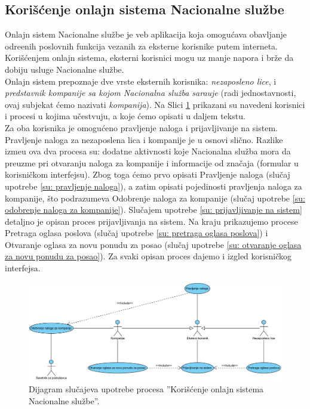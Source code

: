 \subsection{Kori\v s\' cenje onlajn sistema Nacionalne slu\v zbe}

Onlajn sistem Nacionalne slu\v zbe je veb aplikacija koja omogu\' cava obavljanje odre\dj enih poslovnih funkcija vezanih za eksterne korisnike putem interneta. Kori\v s\' cenjem onlajn sistema, eksterni korisnici mogu uz manje napora i br\v ze da dobiju usluge Nacionalne slu\v zbe.\\

Onlajn sistem prepoznaje dve vrste eksternih korisnika: \textit{nezaposleno lice}, i \textit{predstavnik kompanije sa kojom Nacionalna slu\v zba sara\dj uje} (radi jednostavnosti, ovaj subjekat \'cemo nazivati \textit{kompanija}). Na Slici \ref{dsu: koriscenje onlajn sistema nacionalne sluzbe} prikazani su navedeni korisnici i procesi u kojima u\v cestvuju, a koje \'cemo opisati u daljem tekstu.\\

Za oba korisnika je omogu\' ceno pravljenje naloga i prijavljivanje na sistem. Pravljenje naloga za nezaposlena lica i kompanije je u osnovi sli\v cno. Razlike izme\dj u ova dva procesa su: dodatne aktivnosti koje Nacionalna slu\v zba mora da preuzme pri otvaranju naloga za kompanije i informacije od zna\v caja (formular u korisni\v ckom interfejsu). Zbog toga \' cemo prvo opisati Pravljenje naloga (slu\v caj upotrebe \ref{su: pravljenje naloga}), a zatim opisati pojedinosti pravljenja naloga za kompanije, \v sto podrazumeva Odobrenje naloga za kompanije (slu\v caj upotrebe \ref{su: odobrenje naloga za kompanije}). Slu\v cajem upotrebe \ref{su: prijavljivanje na sistem} detaljno je opisan proces prijavljivanja na sistem. Na kraju prikazujemo procese Pretraga oglasa poslova (slu\v caj upotrebe \ref{su: pretraga oglasa poslova}) i Otvaranje oglasa za novu ponudu za posao (slu\v caj upotrebe \ref{su: otvaranje oglasa za novu ponudu za posao}). Za svaki opisan proces dajemo i izgled korisni\v ckog interfejsa.

\begin{figure}[H]
	\centering
	\includegraphics[width=\textwidth]{dijagrami/dijagrami-slucajeva-upotrebe/onlajn-sistem.png}
	\caption{Dijagram slu\v cajeva upotrebe procesa ''Kori\v s\' cenje onlajn sistema Nacionalne slu\v zbe''.}
	\label{dsu: koriscenje onlajn sistema nacionalne sluzbe}
\end{figure}

